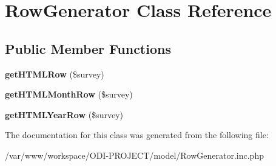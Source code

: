 \section{Row\+Generator Class Reference}
\label{class_row_generator}
\subsection*{Public Member Functions}
\begin{DoxyCompactItemize}
\item 
{\bfseries get\+H\+T\+M\+L\+Row} (\$survey)\label{class_row_generator_aa5e95c25da6424569690f5990babde4e}

\item 
{\bfseries get\+H\+T\+M\+L\+Month\+Row} (\$survey)\label{class_row_generator_a34c8b98c1c860280a7d205601f6da092}

\item 
{\bfseries get\+H\+T\+M\+L\+Year\+Row} (\$survey)\label{class_row_generator_a0ace0e458387abc78041d97589895020}

\end{DoxyCompactItemize}


The documentation for this class was generated from the following file\+:\begin{DoxyCompactItemize}
\item 
/var/www/workspace/\+O\+D\+I-\/\+P\+R\+O\+J\+E\+C\+T/model/Row\+Generator.\+inc.\+php\end{DoxyCompactItemize}
